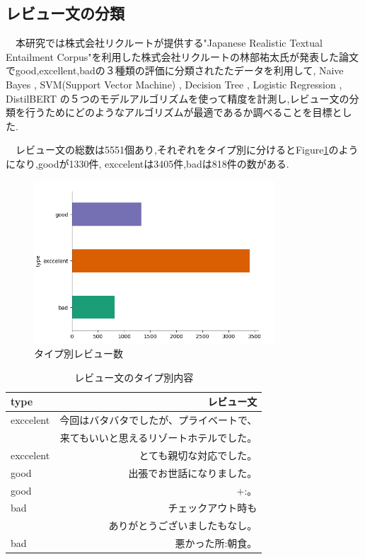 \documentclass[twocolumn,dvipdfmx]{article}
\newcounter{ex}
\begin{document}
 













\subsection{レビュー文の分類}

　本研究では株式会社リクルートが提供する"Japanese Realistic Textual Entailment Corpus"\cite{baitai_data}を利用した株式会社リクルートの林部祐太氏が発表した論文\cite{ronbun2}でgood,excellent,badの３種類の評価に分類されたたデータを利用して, Naive Bayes , SVM(Support Vector Machine)  , Decision Tree , Logistic Regression , DistilBERT の５つのモデルアルゴリズムを使って精度を計測し,レビュー文の分類を行うためにどのようなアルゴリズムが最適であるか調べることを目標とした.
 
 　レビュー文の総数は5551個あり,それぞれをタイプ別に分けるとFigure\ref{data_type}のようになり,goodが1330件,
 exccelentは3405件,badは818件の数がある.
 
\begin{figure}[htbp]
\begin{center}
\includegraphics[width=90mm]{data_type.png}
\caption{タイプ別レビュー数}
\label{data_type}
\end{center}
\end{figure}


\begin{table}[htbp]\centering
  \caption{レビュー文のタイプ別内容}
  \label{naiyou}
\begin{tabular}{|l|r|} \hline
  type & レビュー文  \\ \hline
   exccelent & 今回はバタバタでしたが、プライベートで、\\
              &来てもいいと思えるリゾートホテルでした。\\  \hline
   exccelent & とても親切な対応でした。\\  \hline
   good & 出張でお世話になりました。\\   \hline
   good & +:。   \\  \hline
   bad & チェックアウト時も\\    
   &ありがとうございましたもなし。\\ \hline
   bad & 悪かった所:朝食。\\ \hline
 \end{tabular}
\end{table}
\end{document}
